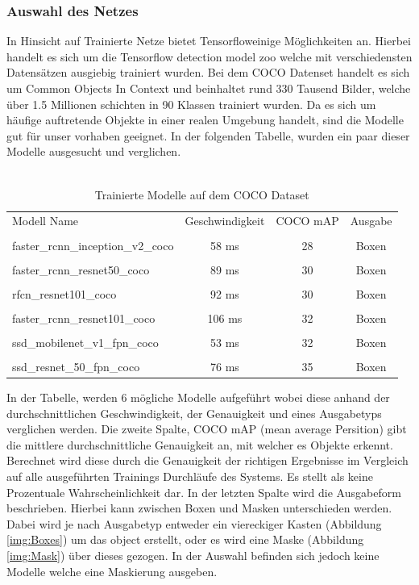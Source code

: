 \documentclass[a4paper,12pt,oneside]{article}
\begin{document}
  \subsubsection{Auswahl des Netzes} 
In Hinsicht auf Trainierte Netze bietet \glqq Tensorflow\grqq einige Möglichkeiten an. Hierbei handelt es sich um die \glqq Tensorflow detection model zoo\grqq \cite{google2018zoo} welche mit verschiedensten Datensätzen ausgiebig trainiert wurden. Bei dem COCO Datenset handelt es sich um \glqq Common Objects In Context\grqq \cite{common2018data} und beinhaltet rund 330 Tausend Bilder, welche über 1.5 Millionen schichten in 90 Klassen trainiert wurden. Da es sich um häufige auftretende Objekte in einer realen Umgebung handelt, sind die Modelle gut für unser vorhaben geeignet. In der folgenden Tabelle, wurden ein paar dieser Modelle ausgesucht und verglichen.
\\
\\

\begin{table}
[h]
\begin{tabular}{|l|c|c|c|}
 
Modell Name & Geschwindigkeit & COCO mAP & Ausgabe\\
 & & & \\
faster\_rcnn\_inception\_v2\_coco & 58 ms & 28 & Boxen\\
 & & & \\
faster\_rcnn\_resnet50\_coco & 89 ms & 30 & Boxen\\
 & & & \\
rfcn\_resnet101\_coco & 92 ms & 30 & Boxen\\
 & & & \\
faster\_rcnn\_resnet101\_coco & 106 ms & 32 & Boxen\\
 & & & \\
ssd\_mobilenet\_v1\_fpn\_coco & 53 ms & 32 & Boxen\\
 & & & \\
ssd\_resnet\_50\_fpn\_coco & 76 ms & 35 & Boxen

\vspace{0.5 cm}
 
\end{tabular}
\caption{Trainierte Modelle auf dem COCO Dataset \cite{google2018zoo}}
\end{table}


In der Tabelle, werden 6 mögliche Modelle aufgeführt wobei diese anhand der durchschnittlichen Geschwindigkeit, der Genauigkeit und eines Ausgabetyps verglichen werden. Die zweite Spalte, COCO mAP (mean average Persition) gibt die mittlere durchschnittliche Genauigkeit an, mit welcher es Objekte erkennt. Berechnet wird diese durch die Genauigkeit der richtigen Ergebnisse im Vergleich auf alle ausgeführten Trainings Durchläufe des Systems. Es stellt als keine Prozentuale Wahrscheinlichkeit dar. In der letzten Spalte wird die Ausgabeform beschrieben. Hierbei kann zwischen Boxen und Masken unterschieden werden. Dabei wird je nach Ausgabetyp entweder ein viereckiger Kasten (Abbildung \ref{img:Boxes}) um das object erstellt, oder es wird eine Maske (Abbildung \ref{img:Mask}) über dieses gezogen. In der Auswahl befinden sich jedoch keine Modelle welche eine Maskierung ausgeben.
\end{document}
